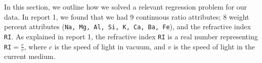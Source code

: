 In this section, we outline how we solved a relevant regression problem for our data. In report 1, we found that we had 9 continuous ratio attributes; 8 weight percent attributes (\texttt{Na, Mg, Al, Si, K, Ca, Ba, Fe}), and the refractive index \texttt{RI}. As explained in report 1, the refractive index \texttt{RI} is a real number representing \texttt{RI}$ =\frac{c}{v}$, where $c$ is the speed of light in vacuum, and $v$ is the speed of light in the current medium. 